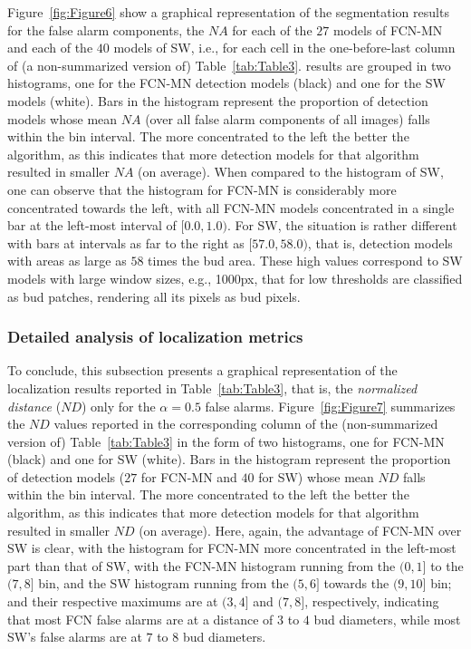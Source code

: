 \documentclass[a4paper,authoryear,review]{elsarticle}
\begin{document}
Figure~\ref{fig:Figure6} show a graphical representation of the segmentation results for the false alarm components, the $NA$ for each of the $27$ models of FCN-MN and each of the $40$ models of SW, i.e., for each cell in the one-before-last column of (a non-summarized version of) Table~\ref{tab:Table3}. results are grouped in two histograms, one for the FCN-MN detection models (black) and one for the SW models (white). Bars in the histogram represent the proportion of detection models whose mean $NA$ (over all false alarm components of all images) falls within the bin interval. The more concentrated to the left the better the algorithm, as this indicates that more detection models for that algorithm resulted in smaller $NA$ (on average). When compared to the histogram of SW, one can observe that the histogram for FCN-MN is considerably more concentrated towards the left, with all FCN-MN models concentrated in a single bar at the left-most interval of $[0.0, 1.0)$. For SW, the situation is rather different with bars at intervals as far to the right as $[57.0, 58.0)$, that is, detection models with areas as large as $58$ times the bud area. These high values correspond to SW models with large window sizes, e.g., 1000px, that for low thresholds are classified as bud patches, rendering all its pixels as bud pixels.

\subsubsection{Detailed analysis of localization metrics}

To conclude, this subsection presents a graphical representation of the localization results reported in Table~\ref{tab:Table3}, that is, the \emph{normalized distance} ($ND$) only for the $\alpha=0.5$ false alarms. 
%
Figure~\ref{fig:Figure7} summarizes the $ND$ values reported in the corresponding column of the (non-summarized version of) Table~\ref{tab:Table3} in the form of two histograms, one for FCN-MN (black) and one for SW (white). Bars in the histogram represent the proportion of detection models ($27$ for FCN-MN and $40$ for SW) whose mean $ND$ falls within the bin interval. The more concentrated to the left the better the algorithm, as this indicates that more detection models for that algorithm resulted in smaller $ND$ (on average).
%
Here, again, the advantage of FCN-MN over SW is clear, with the histogram for FCN-MN more concentrated in the left-most part than that of SW, with the FCN-MN histogram running from the $(0,1]$ to the $(7,8]$ bin, and the SW histogram running from the $(5,6]$ towards the $(9,10]$ bin; and their respective maximums are at $(3,4]$ and $(7,8]$, respectively, indicating that most FCN false alarms are at a distance of $3$ to $4$ bud diameters, while most SW’s false alarms are at $7$ to $8$ bud diameters. 
\end{document}

